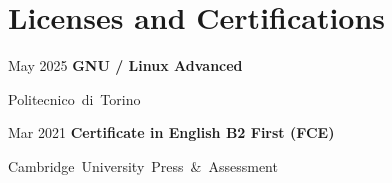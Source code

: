 
\section{Licenses and Certifications}

\begin{samepage}
    \begin{twocolentry}{
        May 2025 %
    }
        \textbf{GNU / Linux Advanced}

        \vspace{0.10 cm}

        \mbox{Politecnico di Torino}

        \vspace{0.10 cm}

    \end{twocolentry}
\end{samepage}

\vspace{0.2 cm} %

\begin{samepage}
    \begin{twocolentry}{
        Mar 2021 %
    }
        \textbf{Certificate in English B2 First (FCE)}

        \vspace{0.10 cm}

        \mbox{Cambridge University Press \& Assessment}

        \vspace{0.10 cm}
        
    \end{twocolentry}
\end{samepage}
